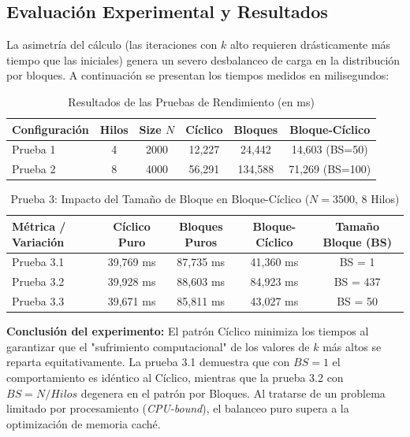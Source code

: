 \documentclass[11pt,a4paper]{article}
\begin{document}
\subsection{Evaluación Experimental y Resultados}
La asimetría del cálculo (las iteraciones con $k$ alto requieren drásticamente más tiempo que las iniciales) genera un severo desbalanceo de carga en la distribución por bloques. A continuación se presentan los tiempos medidos en milisegundos:

\begin{table}[h!]
\centering
\caption{Resultados de las Pruebas de Rendimiento (en ms)}
\begin{tabular}{lccccc}
\toprule
\textbf{Configuración} & \textbf{Hilos} & \textbf{Size $N$} & \textbf{Cíclico} & \textbf{Bloques} & \textbf{Bloque-Cíclico} \\ \midrule
Prueba 1 & 4 & 2000 & 12,227 & 24,442 & 14,603 (BS=50) \\
Prueba 2 & 8 & 4000 & 56,291 & 134,588 & 71,269 (BS=100) \\
\bottomrule
\end{tabular}
\end{table}

\begin{table}[h!]
\centering
\caption{Prueba 3: Impacto del Tamaño de Bloque en Bloque-Cíclico ($N=3500$, 8 Hilos)}
\begin{tabular}{lcccc}
\toprule
\textbf{Métrica / Variación} & \textbf{Cíclico Puro} & \textbf{Bloques Puros} & \textbf{Bloque-Cíclico} & \textbf{Tamaño Bloque (BS)} \\ \midrule
Prueba 3.1 & 39,769 ms & 87,735 ms & 41,360 ms & BS = 1 \\
Prueba 3.2 & 39,928 ms & 88,603 ms & 84,923 ms & BS = 437 \\
Prueba 3.3 & 39,671 ms & 85,811 ms & 43,027 ms & BS = 50 \\
\bottomrule
\end{tabular}
\end{table}

\textbf{Conclusión del experimento:} El patrón Cíclico minimiza los tiempos al garantizar que el "sufrimiento computacional" de los valores de $k$ más altos se reparta equitativamente. La prueba 3.1 demuestra que con $BS=1$ el comportamiento es idéntico al Cíclico, mientras que la prueba 3.2 con $BS = N/Hilos$ degenera en el patrón por Bloques. Al tratarse de un problema limitado por procesamiento (\textit{CPU-bound}), el balanceo puro supera a la optimización de memoria caché.
\end{document}
